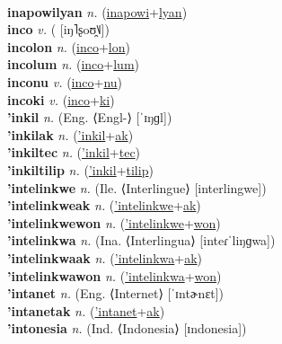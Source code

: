  \label{inapowilon} \\
\textbf{inapowilyan} \textit{n.} (\hyperref[inapowi]{inapowi}+\hyperref[lyan]{lyan})
 \label{inapowilyan} \\
\textbf{inco} \textit{v.} ( [iŋ˥ʂoʊ̯˥˩])
 \label{inco} \\
\textbf{incolon} \textit{n.} (\hyperref[inco]{inco}+\hyperref[lon]{lon})
 \label{incolon} \\
\textbf{incolum} \textit{n.} (\hyperref[inco]{inco}+\hyperref[lum]{lum})
 \label{incolum} \\
\textbf{inconu} \textit{v.} (\hyperref[inco]{inco}+\hyperref[nu]{nu})
 \label{inconu} \\
\textbf{incoki} \textit{v.} (\hyperref[inco]{inco}+\hyperref[ki]{ki})
 \label{incoki} \\
\textbf{'inkil} \textit{n.} (Eng. ⟨Engl-⟩ [ˈɪŋɡl])
 \label{'inkil} \\
\textbf{'inkilak} \textit{n.} (\hyperref['inkil]{'inkil}+\hyperref[ak]{ak})
 \label{'inkilak} \\
\textbf{'inkiltec} \textit{n.} (\hyperref['inkil]{'inkil}+\hyperref[tec]{tec})
 \label{'inkiltec} \\
\textbf{'inkiltilip} \textit{n.} (\hyperref['inkil]{'inkil}+\hyperref[tilip]{tilip})
 \label{'inkiltilip} \\
\textbf{'intelinkwe} \textit{n.} (Ile. ⟨Interlingue⟩ [interlingwe])
 \label{'intelinkwe} \\
\textbf{'intelinkweak} \textit{n.} (\hyperref['intelinkwe]{'intelinkwe}+\hyperref[ak]{ak})
 \label{'intelinkweak} \\
\textbf{'intelinkwewon} \textit{n.} (\hyperref['intelinkwe]{'intelinkwe}+\hyperref[won]{won})
 \label{'intelinkwewon} \\
\textbf{'intelinkwa} \textit{n.} (Ina. ⟨Interlingua⟩ [inteɾˈliŋɡwa])
 \label{'intelinkwa} \\
\textbf{'intelinkwaak} \textit{n.} (\hyperref['intelinkwa]{'intelinkwa}+\hyperref[ak]{ak})
 \label{'intelinkwaak} \\
\textbf{'intelinkwawon} \textit{n.} (\hyperref['intelinkwa]{'intelinkwa}+\hyperref[won]{won})
 \label{'intelinkwawon} \\
\textbf{'intanet} \textit{n.} (Eng. ⟨Internet⟩ [ˈɪntɚnɛt])
 \label{'intanet} \\
\textbf{'intanetak} \textit{n.} (\hyperref['intanet]{'intanet}+\hyperref[ak]{ak})
 \label{'intanetak} \\
\textbf{'intonesia} \textit{n.} (Ind. ⟨Indonesia⟩ [ɪndonesia])

